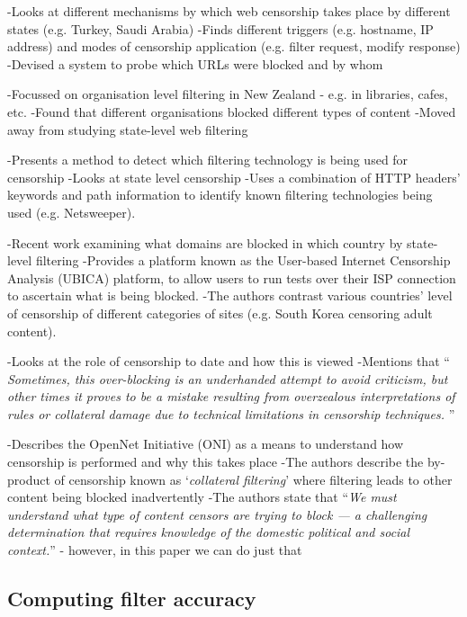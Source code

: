 \documentclass{bmcart}
\begin{document}
\cite{verkamp2012inferring}
-Looks at different mechanisms by which web censorship takes place by different states (e.g. Turkey, Saudi Arabia)
-Finds different triggers (e.g. hostname, IP address) and modes of censorship application (e.g. filter request, modify response)
-Devised a system to probe which URLs were blocked and by whom

\cite{esnaashari2014restrictions}
-Focussed on organisation level filtering in New Zealand - e.g. in libraries, cafes, etc.
-Found that different organisations blocked different types of content
-Moved away from studying state-level web filtering

\cite{dalek2013method}
-Presents a method to detect which filtering technology is being used for censorship
-Looks at state level censorship
-Uses a combination of HTTP headers' keywords and path information to identify known filtering technologies being used (e.g. Netsweeper).

\cite{aceto2015monitoring}
-Recent work examining what domains are blocked in which country by state-level filtering
-Provides a platform known as the User-based Internet Censorship Analysis (UBICA) platform, to allow users to run tests over their ISP connection to ascertain what is being blocked.
-The authors contrast various countries' level of censorship of different categories of sites (e.g. South Korea censoring adult content).

\cite{murdoch2013internet}
-Looks at the role of censorship to date and how this is viewed
-Mentions that ``\textit{ Sometimes, this over-blocking is an underhanded attempt to avoid criticism, but other times it proves to be a mistake resulting from overzealous interpretations of rules or collateral damage due to technical limitations in censorship techniques. }''

\cite{crete2013not}
-Describes the OpenNet Initiative (ONI) as a means to understand how censorship is performed and why this takes place
-The authors describe the by-product of censorship known as `\textit{collateral filtering}' where filtering leads to other content being blocked inadvertently 
-The authors state that ``\textit{We must understand what type of content censors are trying to block — a challenging
determination that requires knowledge of the domestic political and social context.}'' - however, in this paper we can do just that

\subsection*{Computing filter accuracy}
\end{document}
